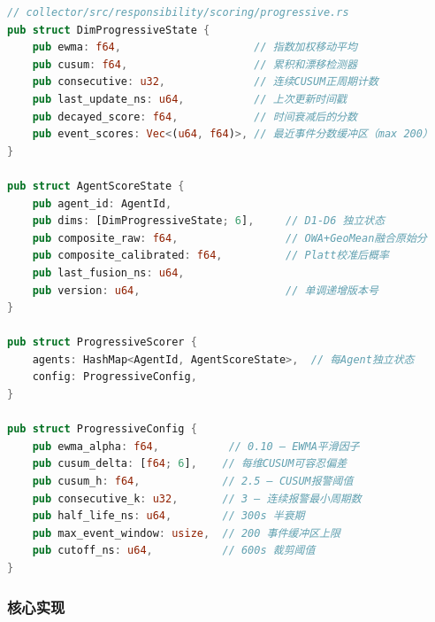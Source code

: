 \documentclass[a4paper]{ctexart}
\makeatletter
\renewcommand{\_}{%
  \ifmmode
    \nfss@text{\textunderscore}%
  \else
    \textunderscore\discretionary{}{}{}%
  \fi}
\makeatother
\begin{document}
\begin{lstlisting}[language=Rust]
// collector/src/responsibility/scoring/progressive.rs
pub struct DimProgressiveState {
    pub ewma: f64,                     // 指数加权移动平均
    pub cusum: f64,                    // 累积和漂移检测器
    pub consecutive: u32,              // 连续CUSUM正周期计数
    pub last_update_ns: u64,           // 上次更新时间戳
    pub decayed_score: f64,            // 时间衰减后的分数
    pub event_scores: Vec<(u64, f64)>, // 最近事件分数缓冲区（max 200）
}

pub struct AgentScoreState {
    pub agent_id: AgentId,
    pub dims: [DimProgressiveState; 6],     // D1-D6 独立状态
    pub composite_raw: f64,                 // OWA+GeoMean融合原始分
    pub composite_calibrated: f64,          // Platt校准后概率
    pub last_fusion_ns: u64,
    pub version: u64,                       // 单调递增版本号
}

pub struct ProgressiveScorer {
    agents: HashMap<AgentId, AgentScoreState>,  // 每Agent独立状态
    config: ProgressiveConfig,
}

pub struct ProgressiveConfig {
    pub ewma_alpha: f64,           // 0.10 — EWMA平滑因子
    pub cusum_delta: [f64; 6],    // 每维CUSUM可容忍偏差
    pub cusum_h: f64,             // 2.5 — CUSUM报警阈值
    pub consecutive_k: u32,       // 3 — 连续报警最小周期数
    pub half_life_ns: u64,        // 300s 半衰期
    pub max_event_window: usize,  // 200 事件缓冲区上限
    pub cutoff_ns: u64,           // 600s 裁剪阈值
}
\end{lstlisting}


\subsubsection{核心实现}
\end{document}
